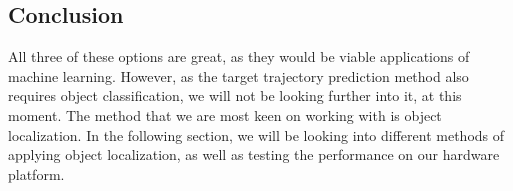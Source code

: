 \subsection{Conclusion}\label{Design:MI:sub:conclusion}
All three of these options are great, as they would be viable applications of machine learning.
However, as the target trajectory prediction method also requires object classification, we will not be looking further into it, at this moment.
The method that we are most keen on working with is object localization.
In the following section, we will be looking into different methods of applying object localization, as well as testing the performance on our hardware platform.

